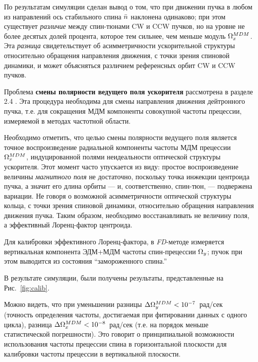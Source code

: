 По результатам симуляции сделан вывод о том, что при движении пучка в любом из направлений 
ось стабильного спина $\bar n$ наклонена одинаково; при этом существует \emph{различие} 
между спин-тюнами CW и CCW пучков, но на уровне не более десятых долей процента, 
которое тем сильнее, чем меньше модуль $\Omega_x^{MDM}$. 
Эта \emph{разница}  свидетельствует об асимметричности ускорительной структуры 
относительно обращения направления движения, с точки зрения спиновой динамики, 
и может объясняться различием референсных орбит CW и CCW пучков. 

Проблема \textbf{смены полярности ведущего поля ускорителя} рассмотрена в разделе 2.4 . 
Эта процедура необходима для смены направления движения дейтронного пучка, 
т.е. для сокращения МДМ компоненты совокупной частоты прецессии, измеряемой в методах частотной области. 

Необходимо отметить, что целью смены полярности ведущего поля является 
точное воспроизведение радиальной компоненты частоты МДМ прецессии $\Omega_x^{MDM}$, 
индуцированной полями неидеальности оптической структуры ускорителя. 
Этот момент часто упускается из виду: простое воспроизведение величины \emph{магнитного поля} 
не достаточно, поскольку точка инжекции центроида пучка, а значит его длина орбиты --- 
и, соответственно, спин-тюн, --- подвержена вариации. Не говоря о возможной асимметричности 
оптической структуры кольца, с точки зрения спиновой динамики, относительно 
обращения направления движения пучка. Таким образом, необходимо восстанавливать не величину поля, 
а эффективный Лоренц-фактор центроида.

Для калибровки эффективного Лоренц-фактора, в \emph{FD}-методе измеряется вертикальная компонента
ЭДМ+МДМ частоты спин-прецессии $\Omega_y$; пучок при этом выводится из состояния ``замороженного спина.'' 

В результате симуляции, были получены результаты, представленные на Рис.~\ref{fig:calib}.

Можно видеть, что при уменьшении разницы ${\Delta\Omega_y^{MDM} < 10^{-7}}$~рад/сек 
(точность определения частоты, достигаемая при фитировании данных с одного цикла), 
разница ${\Delta \Omega_x^{MDM} < 10^{-8}}$~рад/сек (т.е. на порядок меньше статистической погрешности). 
Это говорит о принципиальной возможности использования частоты прецессии спина в горизонтальной плоскости 
для калибровки частоты прецессии в вертикальной плоскости.

